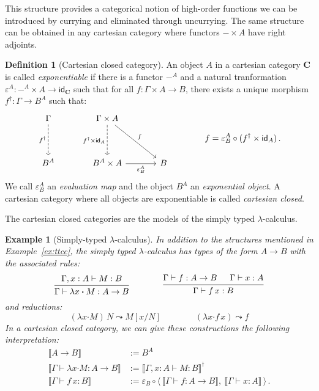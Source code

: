 \documentclass[draft,11pt]{report}
\newtheorem{example}[theorem]{Example}
\theoremstyle{definition}
\newtheorem{definition}[theorem]{Definition}
\newcommand{\kw}[1]{\ensuremath{ \mathsf{#1} }}
\newcommand{\bdot}{\boldsymbol{\cdot}}
\begin{document}
This structure provides
a categorical notion of high-order functions
we can be introduced by currying
and eliminated through uncurrying.
The same structure can be obtained
in any cartesian category where functors
${-} \times A$
have right adjoints.

\begin{definition}[Cartesian closed category] %
An object $A$ in a cartesian category $\mathbf{C}$
is called \emph{exponentiable}
if there is a functor $-^A$ and a natural tranformation
$\varepsilon^A : -^A \times A \rightarrow \kw{id}_\mathbf{C}$
such that for all $f : \Gamma \times A \rightarrow B$,
there exists a unique morphism $f^\dagger : \Gamma \rightarrow B^A$
such that:
\[
  \begin{tikzcd}[row sep=huge, column sep=large]
    \Gamma \ar[d, "f^\dagger"', dashed] &
    \Gamma \times A
      \ar[d, "f^\dagger \times \kw{id}_A"', dashed]
      \ar[dr, "f"] &
    \\
    B^A &
    B^A \times A \ar[r, "\varepsilon^A_B"'] &
    B
  \end{tikzcd}
  \qquad \qquad
  f = \varepsilon^A_B \circ (f^\dagger \times \kw{id}_A)
  \,.
\]
We call $\varepsilon^A_B$ an \emph{evaluation map}
and the object $B^A$ an \emph{exponential object}.
A cartesian category
where all objects are exponentiable
is called \emph{cartesian closed}.
\end{definition}

The cartesian closed categories are the models
of the simply typed $\lambda$-calculus.

\begin{example}[Simply-typed $\lambda$-calculus] %
In addition to the structures mentioned in Example~\ref{ex:ttcc},
the simply typed $\lambda$-calculus has types of the form
$A \rightarrow B$ with the associated rules:
\[
  \begin{prooftree}
    \hypo{\Gamma, x:A \vdash M : B}
    \infer1{\Gamma \vdash \lambda x \bdot M : A \rightarrow B}
  \end{prooftree}
  \qquad \qquad
  \begin{prooftree}
    \hypo{\Gamma \vdash f : A \rightarrow B}
    \hypo{\Gamma \vdash x : A}
    \infer2{\Gamma \vdash f \, x : B}
  \end{prooftree}
\]
and reductions:
\[
  (\lambda x \bdot M) \, N \leadsto M[x/N]
  \qquad \qquad
  (\lambda x \bdot f \, x) \leadsto f
\]
In a cartesian closed category,
we can give these constructions the following interpretation:
\begin{align*}
  \llbracket A \rightarrow B \rrbracket &:= B^A \\
  \llbracket \Gamma \vdash \lambda x \bdot M : A \rightarrow B \rrbracket
    &:= \llbracket \Gamma, x:A \vdash M : B \rrbracket^\dagger \\
  \llbracket \Gamma \vdash f \, x : B \rrbracket &:=
    \varepsilon_B \circ
    \langle \,
      \llbracket \Gamma \vdash f : A \rightarrow B \rrbracket , \:
      \llbracket \Gamma \vdash x : A \rrbracket
    \, \rangle
  \,.
\end{align*}
\end{example}
\end{document}
